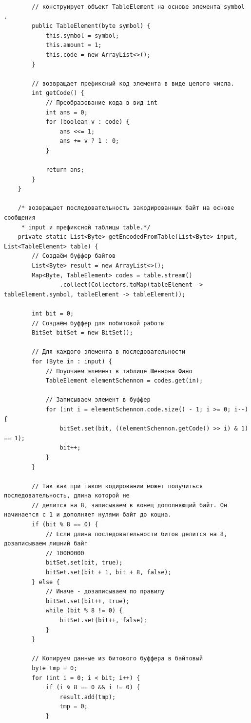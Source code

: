 \documentclass[a4paper,14pt]{extarticle}
\begin{document}
\begin{verbatim}
        // конструирует объект TableElement на основе элемента symbol .
        public TableElement(byte symbol) {
            this.symbol = symbol;
            this.amount = 1;
            this.code = new ArrayList<>();
        }

        // возвращает префиксный код элемента в виде целого числа.
        int getCode() {
            // Преобразование кода в вид int
            int ans = 0;
            for (boolean v : code) {
                ans <<= 1;
                ans += v ? 1 : 0;
            }

            return ans;
        }
    }

    /* возвращает последовательность закодированных байт на основе сообщения
     * input и префиксной таблицы table.*/
    private static List<Byte> getEncodedFromTable(List<Byte> input, List<TableElement> table) {
        // Создаём буффер байтов
        List<Byte> result = new ArrayList<>();
        Map<Byte, TableElement> codes = table.stream()
                .collect(Collectors.toMap(tableElement -> tableElement.symbol, tableElement -> tableElement));

        int bit = 0;
        // Создаём буффер для побитовой работы
        BitSet bitSet = new BitSet();

        // Для каждого элемента в последовательности
        for (Byte in : input) {
            // Поулчаем элемент в таблице Шеннона Фано
            TableElement elementSchennon = codes.get(in);

            // Записываем элемент в буффер
            for (int i = elementSchennon.code.size() - 1; i >= 0; i--) {
                bitSet.set(bit, ((elementSchennon.getCode() >> i) & 1) == 1);
                bit++;
            }
        }

        // Так как при таком кодировании может получиться последовательность, длина которой не
        // делится на 8, записываем в конец дополняющий байт. Он начинается с 1 и дополняет нулями байт до коцна.
        if (bit % 8 == 0) {
            // Если длина последовательности битов делится на 8, дозаписываем лишний байт
            // 10000000
            bitSet.set(bit, true);
            bitSet.set(bit + 1, bit + 8, false);
        } else {
            // Иначе - дозаписываем по правилу
            bitSet.set(bit++, true);
            while (bit % 8 != 0) {
                bitSet.set(bit++, false);
            }
        }

        // Копируем данные из битового буффера в байтовый
        byte tmp = 0;
        for (int i = 0; i < bit; i++) {
            if (i % 8 == 0 && i != 0) {
                result.add(tmp);
                tmp = 0;
            }


\end{verbatim}
\end{document}
